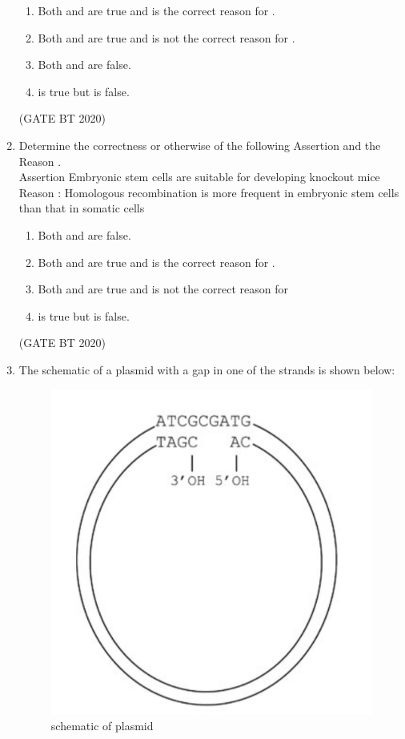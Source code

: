 \documentclass[journal,12pt,onecolumn]{IEEEtran}
\theoremstyle{remark}
\begin{document}
\begin{enumerate}[label=Q\arabic*:, start=26, leftmargin=2em]
\begin{enumerate}[label=\alph*)]
\item\;Both  and   are true and  is the correct reason for  .
\item\;Both    and   are true and  is not the correct reason for  .
\item\;Both    and   are false.
\item\;  is true but   is  false.

\end{enumerate}

\hfill(GATE BT 2020)

\item Determine the correctness or otherwise of the following Assertion  and the Reason .\\
Assertion  Embryonic stem cells are suitable for developing knockout mice\\
Reason : Homologous recombination is more frequent in embryonic stem cells than that in somatic cells

\begin{enumerate}[label=\alph*)]
\item\;Both  and   are false.
\item\;Both and   are true and  is the correct reason for  .
\item\;Both  and   are true and  is not the correct reason for  
\item\; is true but is  false.
\end{enumerate} 

\hfill(GATE BT 2020)


\item The schematic of a plasmid with a gap in one of the strands is shown below:
\begin{figure}[H]
\includegraphics[width=0.3\columnwidth]{figs/figure.jpeg}
\caption{schematic of plasmid}
\label{fig:figure}
\end{figure}


\end{enumerate}
\end{document}
